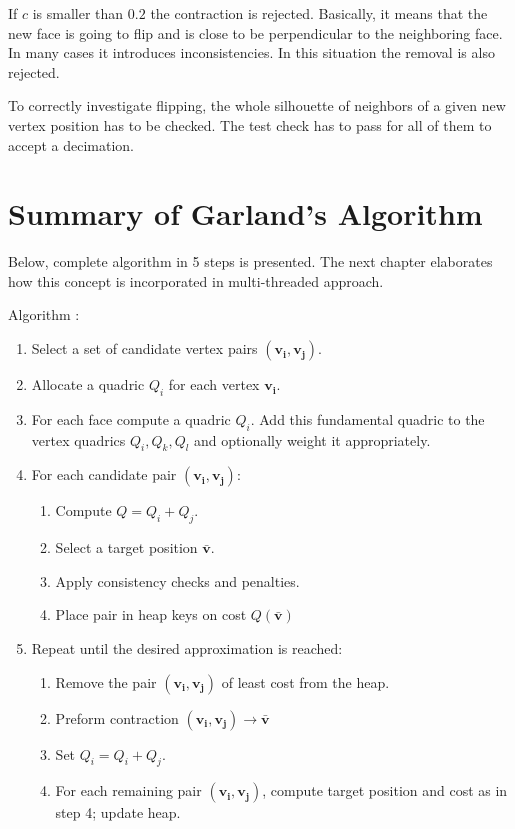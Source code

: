 If $c$ is smaller than $0.2$ the contraction is rejected. Basically, it means that the new face is going to flip and is close to be perpendicular to the neighboring face. In many cases it introduces inconsistencies. In this situation the removal is also rejected.

To correctly investigate flipping, the whole silhouette of neighbors of a given new vertex position has to be checked. The test check has to pass for all of them to accept a decimation.

\newpage
\section{Summary of Garland's Algorithm}

Below, complete algorithm in 5 steps is presented. The next chapter elaborates how this concept is incorporated in multi-threaded approach.

Algorithm \cite{garland99}:

\begin{enumerate}
\item Select a set of candidate vertex pairs $(\mathbf{v_i}, \mathbf{v_j})$.
\item Allocate a quadric $Q_i$ for each vertex $\mathbf{v_i}$.
\item For each face compute a quadric $Q_i$. Add this fundamental quadric to the vertex quadrics $Q_i, Q_k, Q_l$ and optionally weight it appropriately.
\item For each candidate pair $(\mathbf{v_i}, \mathbf{v_j})$:
\begin{enumerate}
\item Compute $Q = Q_i + Q_j$.
\item Select a target position $\mathbf{\bar{v}}$.
\item Apply consistency checks and penalties.
\item Place pair in heap keys on cost $Q(\mathbf{\bar{v}})$
\end{enumerate}
\item Repeat until the desired approximation is reached:
\begin{enumerate}
\item Remove the pair $(\mathbf{v_i}, \mathbf{v_j})$ of least cost from the heap.
\item Preform contraction $(\mathbf{v_i}, \mathbf{v_j})\rightarrow\bar{\mathbf{v}}$
\item Set $Q_i = Q_i + Q_j$.
\item For each remaining pair $(\mathbf{v_i}, \mathbf{v_j})$, compute target position and cost as in step 4; update heap.
\end{enumerate}
\end{enumerate}

